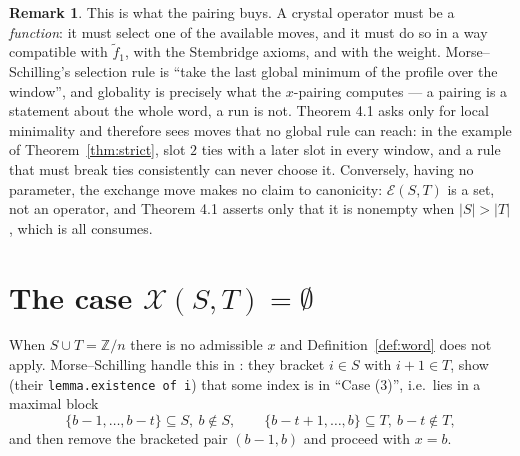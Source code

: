 \documentclass[11pt]{article}
\theoremstyle{definition}
\newtheorem{rem}[thm]{Remark}
\newcommand{\Z}{\mathbb{Z}}
\newcommand{\XX}{\mathcal{X}}
\newcommand{\EE}{\mathcal{E}}
\begin{document}
\begin{rem}
This is what the pairing buys. A crystal operator must be a \emph{function}: it must select one
of the available moves, and it must do so in a way compatible with $\tilde f_1$, with the
Stembridge axioms, and with the weight. Morse--Schilling's selection rule is ``take the last
global minimum of the profile over the window'', and globality is precisely what the
$x$-pairing computes --- a pairing is a statement about the whole word, a run is not. Theorem
4.1 asks only for local minimality and therefore sees moves that no global rule can reach: in
the example of Theorem~\ref{thm:strict}, slot $2$ ties with a later slot in every window, and
a rule that must break ties consistently can never choose it. Conversely, having no parameter,
the exchange move makes no claim to canonicity: $\EE(S,T)$ is a set, not an operator, and
Theorem 4.1 asserts only that it is nonempty when $|S|>|T|$, which is all
\cite[Cor.~4.5]{Clio2} consumes.
\end{rem}

\section{The case $\XX(S,T)=\emptyset$}\label{sec:emptyX}

When $S\cup T=\Z/n$ there is no admissible $x$ and Definition~\ref{def:word} does not apply.
Morse--Schilling handle this in \cite[\S\texttt{two factor case}]{MS}: they bracket $i\in S$ with $i+1\in T$, show
(their \texttt{lemma.existence of i}) that some index is in ``Case (3)'', i.e.\ lies in a maximal block
\[
  \{b-1,\dots,b-t\}\subseteq S,\ b\notin S,\qquad \{b-t+1,\dots,b\}\subseteq T,\ b-t\notin T,
\]
and then remove the bracketed pair $(b-1,b)$ and proceed with $x=b$.
\end{document}
